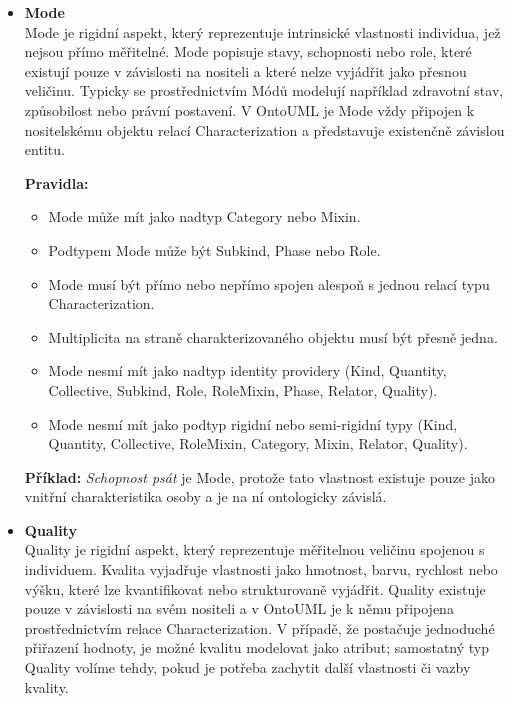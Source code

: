 \begin{itemize}
  \item \textbf{Mode} \\
  Mode je rigidní aspekt, který reprezentuje intrinsické vlastnosti individua, jež nejsou přímo měřitelné. Mode popisuje stavy, schopnosti nebo role, které existují pouze v závislosti na nositeli a které nelze vyjádřit jako přesnou veličinu. Typicky se prostřednictvím Módů modelují například zdravotní stav, způsobilost nebo právní postavení. V OntoUML je Mode vždy připojen k nositelskému objektu relací Characterization a představuje existenčně závislou entitu. \cite{KOM_prezentace4,ontouml_class_stereotypes}

  \textbf{Pravidla:}
  \begin{itemize}
    \item Mode může mít jako nadtyp Category nebo Mixin.
    \item Podtypem Mode může být Subkind, Phase nebo Role.
    \item Mode musí být přímo nebo nepřímo spojen alespoň s jednou relací typu Characterization.
    \item Multiplicita na straně charakterizovaného objektu musí být přesně jedna.
    \item Mode nesmí mít jako nadtyp identity providery (Kind, Quantity, Collective, Subkind, Role, RoleMixin, Phase, Relator, Quality).
    \item Mode nesmí mít jako podtyp rigidní nebo semi-rigidní typy (Kind, Quantity, Collective, RoleMixin, Category, Mixin, Relator, Quality). \cite{ontouml_class_stereotypes}
  \end{itemize}

  \textbf{Příklad:} \textit{Schopnost psát} je Mode, protože tato vlastnost existuje pouze jako vnitřní charakteristika osoby a je na ní ontologicky závislá.


  \item \textbf{Quality} \\
  Quality je rigidní aspekt, který reprezentuje měřitelnou veličinu spojenou s individuem. Kvalita vyjadřuje vlastnosti jako hmotnost, barvu, rychlost nebo výšku, které lze kvantifikovat nebo strukturovaně vyjádřit. Quality existuje pouze v závislosti na svém nositeli a v OntoUML je k němu připojena prostřednictvím relace Characterization. V případě, že postačuje jednoduché přiřazení hodnoty, je možné kvalitu modelovat jako atribut; samostatný typ Quality volíme tehdy, pokud je potřeba zachytit další vlastnosti či vazby kvality. \cite{KOM_prezentace4,ontouml_class_stereotypes}


\end{itemize}
